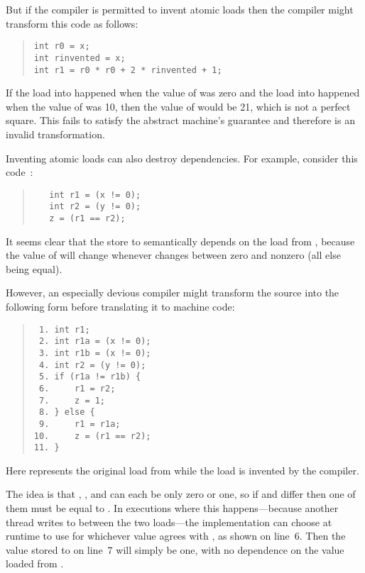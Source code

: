 But if the compiler is permitted to invent atomic loads then the compiler
might transform this code as follows:
\begin{quote}
\begin{verbatim}
int r0 = x;
int rinvented = x;
int r1 = r0 * r0 + 2 * rinvented + 1;
\end{verbatim}
\end{quote}
If the load into  happened when the value of 
was zero and the load into  happened when the value of
 was 10, then the value of  would be 21, which is not
a perfect square.
This fails to satisfy the abstract machine's guarantee
and therefore is an invalid transformation.

Inventing atomic loads can also destroy dependencies.
For example, consider this code~\cite{PaulEMcKenney2023P3046R2/OOTAwithoutTrying}:
\begin{quote}
\begin{verbatim}
   int r1 = (x != 0);
   int r2 = (y != 0);
   z = (r1 == r2);
\end{verbatim}
\end{quote}
It seems clear that the store to  semantically depends on the load
from , because the value of  will change whenever 
changes between zero and nonzero (all else being equal).

However, an especially devious compiler might transform the source into
the following form before translating it to machine code:
\begin{quote}
\begin{verbatim}
 1. int r1;
 2. int r1a = (x != 0);
 3. int r1b = (x != 0);
 4. int r2 = (y != 0);
 5. if (r1a != r1b) {
 6.     r1 = r2;
 7.     z = 1;
 8. } else {
 9.     r1 = r1a;
10.     z = (r1 == r2);
11. }
\end{verbatim}
\end{quote}
Here  represents the original load from  while the 
load is invented by the compiler.

The idea is that , , and  can each be only zero or one,
so if  and  differ then one of them must be equal to .
In executions where this happens---because another thread writes to 
between the two loads---the implementation can choose at runtime to use
for  whichever value agrees with , as shown on line~6.
Then the value stored to  on line~7 will simply be one,
with no dependence on the value loaded from .

